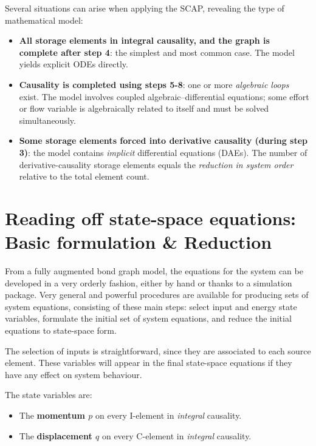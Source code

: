 \begin{insightbox}
Several situations can arise when applying the SCAP, revealing the type of mathematical model:
\begin{itemize}[leftmargin=1.5em,itemsep=0pt]
  \item \textbf{All storage elements in integral causality, and the graph is complete after step 4}: the simplest and most common case. The model yields explicit ODEs directly.
  \item \textbf{Causality is completed using steps 5-8}: one or more \emph{algebraic loops} exist. The model involves coupled algebraic--differential equations; some effort or flow variable is algebraically related to itself and must be solved simultaneously.
  \item \textbf{Some storage elements forced into derivative causality (during step 3)}: the model contains \emph{implicit} differential equations (DAEs). The number of derivative-causality storage elements equals the \emph{reduction in system order} relative to the total element count.
\end{itemize}
\end{insightbox}

\section{Reading off state-space equations: Basic formulation \& Reduction}

From a fully augmented bond graph model, the equations for the system can be developed in a very orderly fashion, either by hand or thanks to a simulation package. Very general and powerful procedures are available for producing sets of system equations, consisting of these main steps: select input and energy state variables, formulate the initial set of system equations, and reduce the initial equations to state-space form.

The selection of inputs is straightforward, since they are associated to each source element. These variables will appear in the final state-space equations if they have any effect on system behaviour.

The state variables are:
\begin{itemize}[leftmargin=2em,itemsep=0pt]
  \item The \textbf{momentum $p$} on every I-element in \emph{integral} causality.
  \item The \textbf{displacement $q$} on every C-element in \emph{integral} causality.
\end{itemize}

